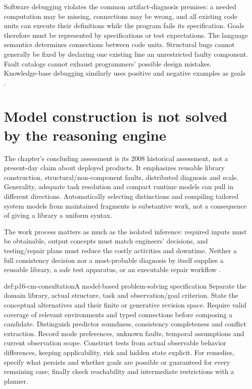 Software debugging violates the common artifact-diagnosis premises: a needed
computation may be missing, connections may be wrong, and all existing code
units can execute their definitions while the program fails its specification.
Goals therefore must be represented by specifications or test expectations.
The language semantics determines connections between code units. Structural
bugs cannot generally be fixed by declaring one existing line an unrestricted
faulty component. Fault catalogs cannot exhaust programmers' possible design
mistakes. Knowledge-base debugging similarly uses positive and negative
examples as goals \cite[secs.~10.7.3]{Struss2008ModelBasedProblemSolving}.

\section{Model construction is not solved by the reasoning engine}
\label{sec:p16-cm-challenges}

The chapter's concluding assessment is its 2008 historical assessment,
not a present-day claim about deployed products. It emphasizes reusable
library construction, structural/non-component faults, distributed diagnosis
and scale. Generality, adequate task resolution and compact runtime models
can pull in different directions. Automatically selecting distinctions and
compiling tailored system models from maintained fragments is substantive
work, not a consequence of giving a library a uniform syntax.

The work process matters as much as the isolated inference: required inputs
must be obtainable, output concepts must match engineers' decisions, and
testing/repair plans must reduce the costly activities and downtime.
Neither a full consistency decision nor a most-probable diagnosis by itself
supplies a reusable library, a safe test apparatus, or an executable repair
workflow \cite[sec.~10.8]{Struss2008ModelBasedProblemSolving}.

\begin{hbmethod}{def:p16-cm-consultation}{A model-based problem-solving specification}
Separate the domain library, actual structure, task and observation/goal
criterion. State the conceptual alternatives and their finite or generative
revision space. Require valid coverage of relevant environments and typed
connections before composing a candidate. Distinguish predictor soundness,
consistency completeness and conflict extraction. Record mode preferences,
unknown faults, temporal assumptions and current observation scope.
Construct tests from actual observable behavior differences, keeping
applicability, risk and hidden state explicit. For remedies, specify what
persists and whether goals are possible or guaranteed for every remaining
case; finally check reachability and intermediate restrictions with a planner.
\end{hbmethod}

